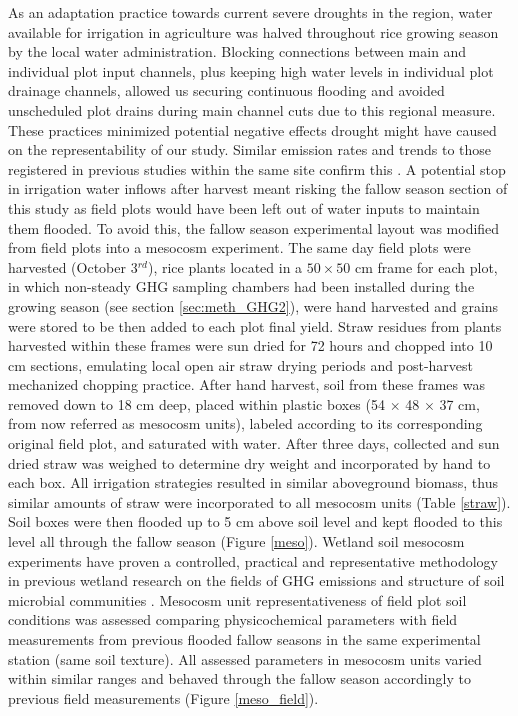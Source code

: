 As an adaptation practice towards current severe droughts in the region, water available for irrigation in agriculture was halved throughout rice growing season by the local water administration. Blocking connections between main and individual plot input channels, plus keeping high water levels in individual plot drainage channels, allowed us securing continuous flooding and avoided unscheduled plot drains during main channel cuts due to this regional measure. These practices minimized potential negative effects drought might have caused on the representability of our study. Similar emission rates and trends to those registered in previous studies within the same site confirm this \citep{martinez-eixarch2021a}. A potential stop in irrigation water inflows after harvest meant risking the fallow season section of this study as field plots would have been left out of water inputs to maintain them flooded. To avoid this, the fallow season experimental layout was modified from field plots into a mesocosm experiment. The same day field plots were harvested (October 3$^{rd}$), rice plants located in a $50 \times 50$ cm frame for each plot, in which non-steady GHG sampling chambers had been installed during the growing season (see section \ref{sec:meth_GHG2}), were hand harvested and grains were stored to be then added to each plot final yield. Straw residues from plants harvested within these frames were sun dried for 72 hours and chopped into 10 cm sections, emulating local open air straw drying periods and post-harvest mechanized chopping practice. After hand harvest, soil from these frames was removed down to 18 cm deep, placed within plastic boxes (54 $\times$ 48 $\times$ 37 cm, from now referred as mesocosm units), labeled according to its corresponding original field plot, and saturated with water. After three days, collected and sun dried straw was weighed to determine dry weight and incorporated by hand to each box. All irrigation strategies resulted in similar aboveground biomass, thus similar amounts of straw were incorporated to all mesocosm units (Table \ref{straw}). Soil boxes were then flooded up to 5 cm above soil level and kept flooded to this level all through the fallow season (Figure \ref{meso}). Wetland soil mesocosm experiments have proven a controlled, practical and representative methodology in previous wetland research on the fields of GHG emissions \citep{capooci2019experimental} and structure of soil microbial communities \citep{donato2020nitrogen}. Mesocosm unit representativeness of field plot soil conditions was assessed comparing physicochemical parameters with field measurements from previous flooded fallow seasons in the same experimental station (same soil texture). All assessed parameters in mesocosm units varied within similar ranges and behaved through the fallow season accordingly to previous field measurements (Figure \ref{meso_field}). \\


